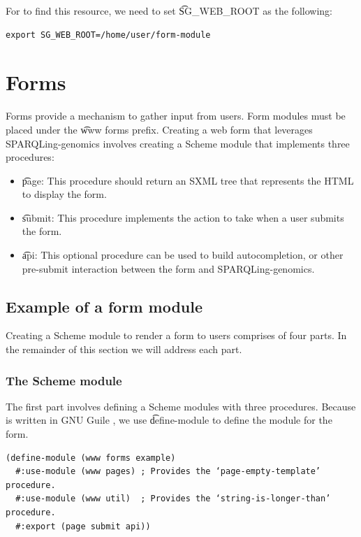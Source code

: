   For  to find this resource, we need to set \t{SG\_WEB\_ROOT}
  as the following:
\begin{siderules}
\begin{verbatim}
export SG_WEB_ROOT=/home/user/form-module
\end{verbatim}
\end{siderules}

\section{Forms}
\label{sec:forms}

  Forms provide a mechanism to gather input from users.  Form modules must be
  placed under the \t{www forms} prefix.  Creating a web form that leverages
  SPARQLing-genomics involves creating a Scheme module that implements three
  procedures:
  \begin{itemize}
  \item \t{page}: This procedure should return an SXML tree that represents
    the HTML to display the form.
  \item \t{submit}: This procedure implements the action to take when a user
    submits the form.
  \item \t{api}: This optional procedure can be used to build autocompletion,
    or other pre-submit interaction between the form and SPARQLing-genomics.
  \end{itemize}

\subsection{Example of a form module}

  Creating a Scheme module to render a form to users comprises of four
  parts.  In the remainder of this section we will address each part.

\subsubsection{The Scheme module}
\label{sec:scheme-module}

  The first part involves defining a Scheme modules with three procedures.
  Because  is written in GNU Guile \citep{guile},
  we use \t{define-module} to define the module for the form.

\begin{siderules}
\begin{verbatim}
(define-module (www forms example)
  #:use-module (www pages) ; Provides the ‘page-empty-template’ procedure.
  #:use-module (www util)  ; Provides the ‘string-is-longer-than’ procedure.
  #:export (page submit api))
\end{verbatim}
\end{siderules}


